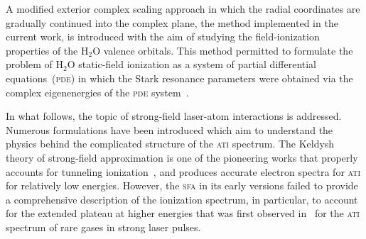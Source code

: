 
A modified exterior complex scaling approach in which the radial
coordinates are gradually continued into the complex plane, the method
implemented in the current work, is introduced with the aim of
studying the field-ionization properties of the H$_{2}$O valence
orbitals. This method permitted to formulate the problem of H$_{2}$O
static-field ionization as a system of partial differential
equations~(\textsc{pde}) in which the Stark resonance parameters were
obtained via the complex eigenenergies of the \textsc{pde}
system~\cite{sarias_2016,sarias_2017}.






In what follows, the topic of strong-field laser-atom interactions is
addressed. Numerous formulations have been introduced which aim to
understand the physics behind the complicated structure of the
\textsc{ati} spectrum.  The Keldysh theory of strong-field
approximation is one of the pioneering works that properly accounts
for tunneling ionization~\cite{KeldyshSFA}, and produces accurate
electron spectra for \textsc{ati} for relatively low
energies. However, the \textsc{sfa} in its early versions failed to
provide a comprehensive description of the ionization spectrum, in
particular, to account for the extended plateau at higher energies
that was first observed in~\cite{Paulus_1994plateau} for the
\textsc{ati} spectrum of rare gases in strong laser pulses.

